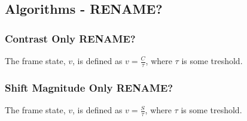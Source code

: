\subsection{Algorithms - RENAME?}
%
\subsubsection{Contrast Only RENAME?}
%
The frame state, $v$, is defined as $v=\frac{C}{\tau}$, %
%
where $\tau$ is some treshold.
%
\subsubsection{Shift Magnitude Only RENAME?}
%
The frame state, $v$, is defined as $v=\frac{S}{\tau}$, %
%
where $\tau$ is some treshold.
%
